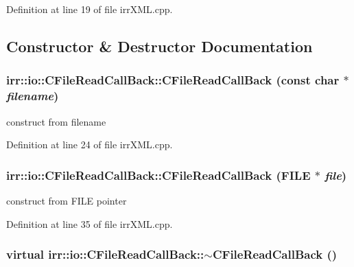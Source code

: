 Definition at line 19 of file irrXML.cpp.

\subsection{Constructor \& Destructor Documentation}
\hypertarget{classirr_1_1io_1_1_c_file_read_call_back_abc79875f8e09ff21d9c2a01f1907eca}{
\subsubsection[{CFileReadCallBack}]{\setlength{\rightskip}{0pt plus 5cm}irr::io::CFileReadCallBack::CFileReadCallBack (const char $\ast$ {\em filename})}}
\label{classirr_1_1io_1_1_c_file_read_call_back_abc79875f8e09ff21d9c2a01f1907eca}


construct from filename 



Definition at line 24 of file irrXML.cpp.\hypertarget{classirr_1_1io_1_1_c_file_read_call_back_19c2fe29ebd44f95b33ef85e26cd7ca9}{
\subsubsection[{CFileReadCallBack}]{\setlength{\rightskip}{0pt plus 5cm}irr::io::CFileReadCallBack::CFileReadCallBack (FILE $\ast$ {\em file})}}
\label{classirr_1_1io_1_1_c_file_read_call_back_19c2fe29ebd44f95b33ef85e26cd7ca9}


construct from FILE pointer 



Definition at line 35 of file irrXML.cpp.\hypertarget{classirr_1_1io_1_1_c_file_read_call_back_ff501b54688e10c2cd0418f982f52799}{
\subsubsection[{$\sim$CFileReadCallBack}]{\setlength{\rightskip}{0pt plus 5cm}virtual irr::io::CFileReadCallBack::$\sim$CFileReadCallBack ()}}
\label{classirr_1_1io_1_1_c_file_read_call_back_ff501b54688e10c2cd0418f982f52799}



